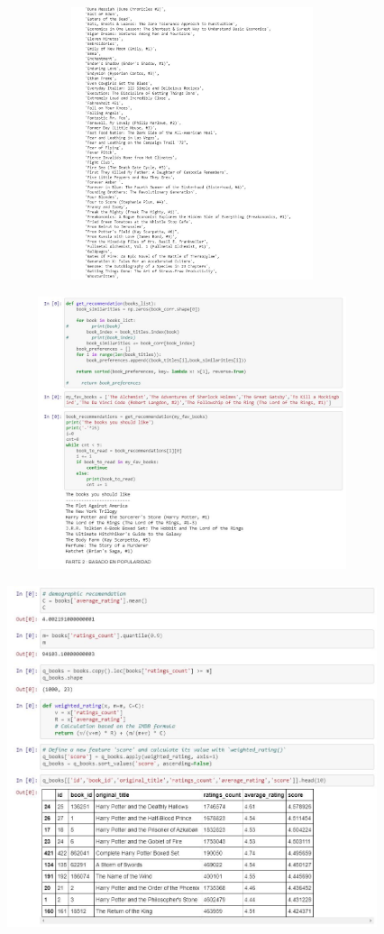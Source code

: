 \begin{center}
\includegraphics[width=18cm, height=8cm]{./Imagenes/traba11.jpg}
\end{center}


\begin{center}
\includegraphics[width=18cm, height=8cm]{./Imagenes/traba12.jpg}
\end{center}


\begin{center}
\includegraphics[width=14cm, height=10cm]{./Imagenes/traba13.jpg}
\end{center}


